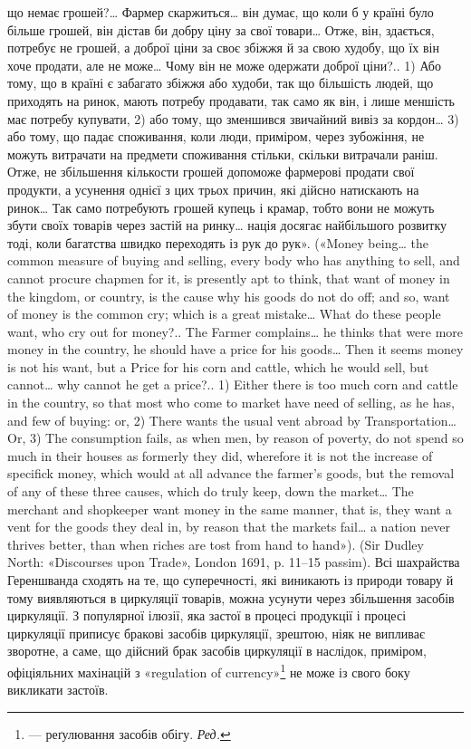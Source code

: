 що немає грошей?\dots{} Фармер скаржиться\dots{} він думає, що коли б у країні
було більше грошей, він дістав би добру ціну за свої товари\dots{} Отже, він,
здається, потребує не грошей, а доброї ціни за своє збіжжя й за свою худобу,
що їх він хоче продати, але не може\dots{} Чому він не може одержати
доброї ціни?.. 1) Або тому, що в країні є забагато збіжжя або худоби,
так що більшість людей, що приходять на ринок, мають потребу продавати,
так само як він, і лише меншість має потребу купувати, 2) або
тому, що зменшився звичайний вивіз за кордон\dots{} 3) або тому, що падає
споживання, коли люди, приміром, через зубожіння, не можуть витрачати
на предмети споживання стільки, скільки витрачали раніш. Отже,
не збільшення кількости грошей допоможе фармерові продати свої продукти,
а усунення однієї з цих трьох причин, які дійсно натискають на
ринок\dots{} Так само потребують грошей купець і крамар, тобто вони не можуть
збути своїх товарів через застій на ринку\dots{} нація досягає найбільшого
розвитку тоді, коли багатства швидко переходять із рук до рук».
(«Money being\dots{} the common measure of buying and selling, every body
who has anything to sell, and cannot procure chapmen for it, is presently
apt to think, that want of money in the kingdom, or country, is the cause
why his goods do not do off; and so, want of money is the common cry;
which is a great mistake\dots{} What do these people want, who cry out for
money?.. The Farmer complains\dots{} he thinks that were more money in the
country, he should have a price for his goods\dots{} Then it seems money is not
his want, but a Price for his corn and cattle, which he would sell, but cannot\dots{}
why cannot he get a price?.. 1) Either there is too much corn and cattle
in the country, so that most who come to market have need of selling,
as he has, and few of buying: or, 2) There wants the usual vent abroad by
Transportation\dots{} Or, 3) The consumption fails, as when men, by reason of
poverty, do not spend so much in their houses as formerly they did, wherefore
it is not the increase of specifick money, which would at all advance
the farmer’s goods, but the removal of any of these three causes, which
do truly keep, down the market\dots{} The merchant and shopkeeper want money
in the same manner, that is, they want a vent for the goods they deal in,
by reason that the markets fail\dots{} a nation never thrives better, than when
riches are tost from hand to hand»). (Sir Dudley North: «Discourses upon
Trade», London 1691, p. 11--15 passim). Всі шахрайства Гереншванда
сходять на те, що суперечності, які виникають із природи товару й тому
виявляються в циркуляції товарів, можна усунути через збільшення
засобів циркуляції. З популярної ілюзії, яка застої в процесі продукції
і процесі циркуляції приписує бракові засобів циркуляції, зрештою,
ніяк не випливає зворотне, а саме, що дійсний брак засобів циркуляції
в наслідок, приміром, офіціяльних махінацій з «regulation of
currency»\footnote*{
— реґулювання засобів обігу. \emph{Ред.}
} не може із свого боку викликати застоїв.
